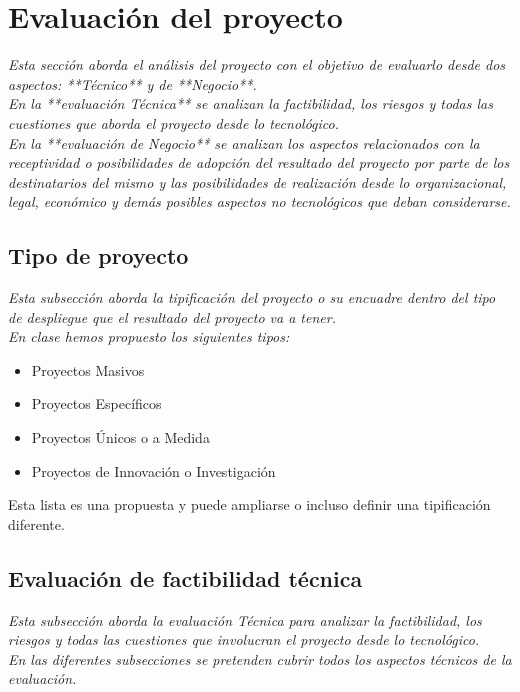 \documentclass[12pt]{article}
\begin{document}
\section{Evaluación del proyecto}
{\it
Esta sección aborda el análisis del proyecto con el objetivo de evaluarlo desde dos aspectos: **Técnico** y de **Negocio**.\\
En la **evaluación Técnica** se analizan la factibilidad, los riesgos y todas las cuestiones que aborda el proyecto desde lo tecnológico.\\
En la **evaluación de Negocio** se analizan los aspectos relacionados con la receptividad o posibilidades de adopción del resultado del proyecto por parte de los destinatarios del mismo y las posibilidades de realización desde lo organizacional, legal, económico y demás posibles aspectos no tecnológicos que deban considerarse.
}


\subsection{Tipo de proyecto}
{\it
Esta subsección aborda la tipificación del proyecto o su encuadre dentro del tipo de despliegue que el resultado del proyecto va a tener.\\
En clase hemos propuesto los siguientes tipos:
\begin{itemize}
\setlength{\itemsep}{0pt}
  \item Proyectos Masivos
  \item Proyectos Específicos
  \item Proyectos Únicos o a Medida
  \item Proyectos de Innovación o Investigación
\end{itemize}
Esta lista es una propuesta y puede ampliarse o incluso definir una tipificación diferente.
}


\subsection{Evaluación de factibilidad técnica}
{\it
Esta subsección aborda la evaluación Técnica para analizar la factibilidad, los riesgos y todas las cuestiones que involucran el proyecto desde lo tecnológico.\\
En las diferentes subsecciones se pretenden cubrir todos los aspectos técnicos de la evaluación.
}
\end{document}

